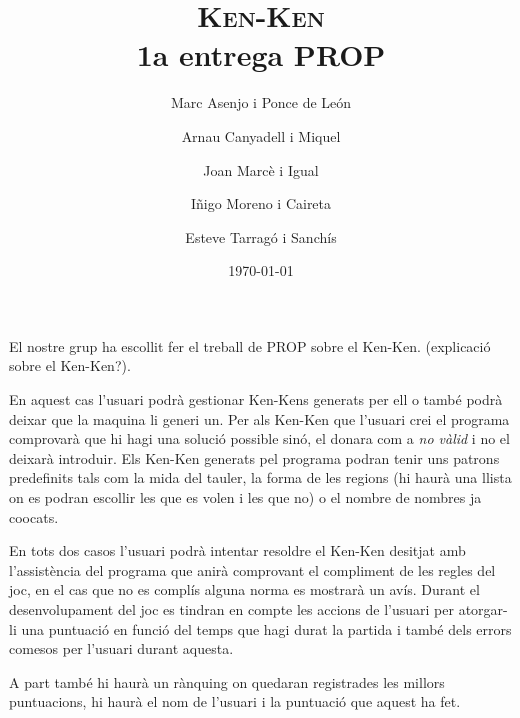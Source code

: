 \documentclass[a4paper,12pt]{article}
\begin{document}
\title{\textsc{Ken-Ken} \\ \large 1a entrega PROP}
\author{Marc Asenjo i Ponce de León \and
	Arnau Canyadell i Miquel \and
	Joan Marcè i Igual \and
	Iñigo Moreno i Caireta \and
	Esteve Tarragó i Sanchís}

\date{\today}
\maketitle

El nostre grup ha escollit fer el treball de PROP sobre el Ken-Ken. (explicació
sobre el Ken-Ken?). 

En aquest cas l'usuari podrà gestionar Ken-Kens generats per ell o també podrà
deixar que la maquina li generi un. 
Per als Ken-Ken que l'usuari crei el programa comprovarà que hi hagi una solució
possible sinó, el donara com a \emph{no vàlid} i no el deixarà introduir. Els Ken-Ken generats 
pel programa podran tenir uns patrons predefinits tals com la mida del tauler, la forma de les 
regions (hi haurà una llista on es podran escollir les que es volen i les que no) o el nombre 
de nombres ja co\lgem ocats.

En tots dos casos l'usuari podrà intentar resoldre el Ken-Ken desitjat amb
l'assistència del programa que anirà comprovant el compliment de les regles del
joc, en el cas que no es complís alguna norma es mostrarà un avís. Durant el
desenvolupament del joc es tindran en compte les accions de l'usuari per
atorgar-li una puntuació en funció del temps que hagi durat la partida
i també dels errors comesos per l'usuari durant aquesta.

A part també hi haurà un rànquing on quedaran registrades les millors puntuacions,
hi haurà el nom de l'usuari i la puntuació que aquest ha fet.

\vspace{2cm}

\end{document}
